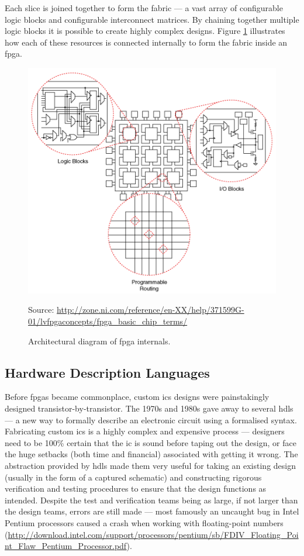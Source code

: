 Each slice is joined together to form the fabric --- a vast array of configurable logic blocks and configurable interconnect matrices. By chaining together multiple logic blocks it is possible to create highly complex designs. Figure \ref{fig:fpga_diagram} illustrates how each of these resources is connected internally to form the fabric inside an \gls{fpga}. 

\begin{figure}
  \centering
  \includegraphics[width=1\textwidth]{./img/fpga_arch_diagram.png}\par
Source: \url{http://zone.ni.com/reference/en-XX/help/371599G-01/lvfpgaconcepts/fpga_basic_chip_terms/}
  \caption{Architectural diagram of \gls{fpga} internals.}
  \label{fig:fpga_diagram}
\end{figure}

\subsection{Hardware Description Languages}
Before \glspl{fpga} became commonplace, custom \glspl{ic} designs were painstakingly designed transistor-by-transistor. The 1970s and 1980s gave away to several \glspl{hdl} --- a new way to formally describe an electronic circuit using a formalised syntax. Fabricating custom \glspl{ic} is a highly complex and expensive process --- designers need to be 100\% certain that the \gls{ic} is sound before taping out the design, or face the huge setbacks (both time and financial) associated with getting it wrong. The abstraction provided by \glspl{hdl} made them very useful for taking an existing design (usually in the form of a captured schematic) and constructing rigorous verification and testing procedures to ensure that the design functions as intended. Despite the test and verification teams being as large, if not larger than the design teams, errors are still made --- most famously an uncaught bug in Intel Pentium processors caused a crash when working with floating-point numbers (\url{http://download.intel.com/support/processors/pentium/sb/FDIV_Floating_Point_Flaw_Pentium_Processor.pdf}). 

